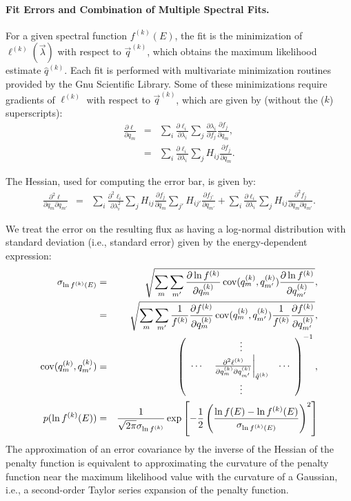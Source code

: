 \documentclass{article}    %
\newcommand{\cov}{\mathop{{\rm cov}}}
\newcommand{\subsubsubsection}[1]{\paragraph{#1.}}
\begin{document}
\subsubsubsection{Fit Errors and Combination of Multiple Spectral Fits}

For a given spectral function $f^{(k)}(E)$, the fit is the
minimization of $\ell^{(k)}(\vec{\lambda})$ with respect to
$\vec{q}^{(k)}$, which obtains the maximum likelihood estimate
$\hat{q}^{(k)}$. Each fit is performed with multivariate minimization
routines provided by the Gnu Scientific Library. Some of these
minimizations require gradients of $\ell^{(k)}$ with respect to
$\vec{q}^{(k)}$, which are given by (without the ($k$) superscripts):
\begin{eqnarray}
\frac{\partial \ell}{\partial q_m} &=&
\sum_i \frac{\partial \ell_i}{\partial \lambda_i} \sum_j \frac{\partial\lambda_i }{\partial f_j} \frac{\partial f_j}{\partial q_m}, \nonumber \\
&=&
\sum_i \frac{\partial \ell_i}{\partial \lambda_i} \sum_j H_{ij} \frac{\partial f_j}{\partial q_m}.
\end{eqnarray}

The Hessian, used for computing the error bar, is given by:
\begin{eqnarray}
\frac{\partial^2 \ell}{\partial q_m \partial q_{m'}} &=&
\sum_i \frac{\partial^2 \ell_i}{\partial \lambda_i^2} \sum_j H_{ij} \frac{\partial f_j}{\partial q_m}\sum_{j'} H_{ij'} \frac{\partial f_{j'}}{\partial q_{m'}} +
\sum_i \frac{\partial \ell_i}{\partial \lambda_i} \sum_j H_{ij} \frac{\partial^2 f_j}{\partial q_m \partial q_{m'}}
.
\end{eqnarray}


We treat the error on the resulting flux as having a log-normal
distribution with standard deviation (i.e., standard error) given by
the energy-dependent expression:
\begin{eqnarray}
\sigma_{\ln f^{(k)}(E)} &=& \sqrt{
\sum_m \sum_{m'} \frac{\partial \ln f^{(k)}}{\partial q^{(k)}_m} \cov(q^{(k)}_m,q^{(k)}_{m'}) \frac{\partial \ln f^{(k)}}{\partial q^{(k)}_{m'}} 
}, \nonumber \\
&=& \sqrt{
\sum_m \sum_{m'} \frac{1}{f^{(k)}} \frac{\partial f^{(k)}}{\partial q^{(k)}_m} \cov(q^{(k)}_m,q^{(k)}_{m'}) \frac{1}{f^{(k)}} \frac{\partial f^{(k)}}{\partial q^{(k)}_{m'}} 
}, \\
\cov(q^{(k)}_m,q^{(k)}_{m'}) &=& \left(
\begin{array}{ccc}
~ & \vdots & ~ \\
\cdots & \left.
\frac{\partial^2 \ell^{(k)}}{\partial q^{(k)}_m \partial q^{(k)}_{m'}}
\right|_{\hat{q}^{(k)}}
& \cdots \\
~ & \vdots & ~ 
\end{array}
\right)^{-1}, \\
p(\ln f^{(k)}(E)) &=& \frac{1}{\sqrt{2\pi}\sigma_{\ln f^{(k)}}}\exp\left[
-\frac{1}{2}\left(\frac{\ln f(E) - \ln f^{(k)}(E)}{\sigma_{\ln f^{(k)}(E)}}\right)^2
\right]
\end{eqnarray}
The approximation of an error covariance by the inverse of the Hessian
of the penalty function is equivalent to approximating the curvature
of the penalty function near the maximum likelihood value with the
curvature of a Gaussian, i.e., a second-order Taylor series expansion
of the penalty function.
\end{document}
